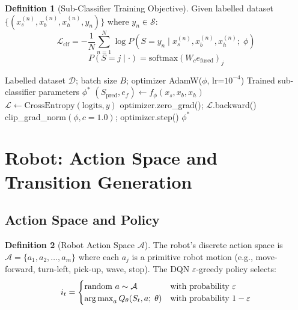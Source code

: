 \documentclass[12pt,a4paper]{article}
\theoremstyle{definition}
\newtheorem{definition}{Definition}[section]
\theoremstyle{plain}
\theoremstyle{remark}
\newcommand{\Loss}{\mathcal{L}}
\newcommand{\argmax}{\operatornamewithlimits{arg\,max}}
\newcommand{\Qeval}{Q_\theta}
\newcommand{\softmax}{\mathrm{softmax}}
\begin{document}
\begin{definition}[Sub-Classifier Training Objective]
Given labelled dataset $\{(x_s^{(n)}, x_b^{(n)}, x_h^{(n)}, y_n)\}$ where $y_n \in \mathcal{S}$:
\[
  \Loss_{\text{clf}} = -\frac{1}{N}\sum_{n=1}^N \log P(S = y_n \mid x_s^{(n)}, x_b^{(n)}, x_h^{(n)};\; \phi)
\]
\[
  P(S = j \mid \cdot) = \softmax(W_c e_{\text{fused}})_j
\]
\end{definition}

\begin{algorithm}[H]
\caption{Sub-Classifier Training Loop}
\label{alg:subclf_train}
\begin{algorithmic}[1]
\Require Labelled dataset $\mathcal{D}$; batch size $B$; optimizer AdamW($\phi$, lr=$10^{-4}$)
\Ensure Trained sub-classifier parameters $\phi^*$
    \State $(S_{\text{pred}}, e_f) \gets f_\phi(x_s, x_b, x_h)$ 
    \State $\Loss \gets \text{CrossEntropy}(\text{logits}, y)$
    \State optimizer.zero\_grad(); $\Loss$.backward()
    \State clip\_grad\_norm$(\phi, c=1.0)$; optimizer.step()
  \EndFor
\EndFor
\State \Return $\phi^*$
\end{algorithmic}
\end{algorithm}

\newpage
\section{Robot: Action Space and Transition Generation}
\label{sec:robot}

\subsection{Action Space and Policy}

\begin{definition}[Robot Action Space $\mathcal{A}$]
The robot's discrete action space is $\mathcal{A} = \{a_1, a_2, \ldots, a_m\}$ where each $a_j$ is a primitive robot motion (e.g., move-forward, turn-left, pick-up, wave, stop). The DQN $\varepsilon$-greedy policy selects:
\[
  i_t = \begin{cases}
    \text{random } a \sim \mathcal{A} & \text{with probability } \varepsilon \\
    \argmax_{a} \Qeval(S_t, a;\; \theta) & \text{with probability } 1 - \varepsilon
  \end{cases}
\]
\end{definition}
\end{document}
